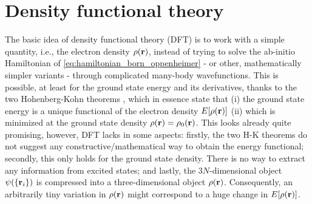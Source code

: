 \documentclass[../../main.tex]{subfiles}
\begin{document}
\section{Density functional theory}\label{sec:dft}

The basic idea of density functional theory (DFT) is to work with a simple quantity, i.e., the electron density $\rho(\textbf{r})$, instead of trying to solve the ab-initio Hamiltonian of \eqref{eq:hamiltonian_born_oppenheimer} - or other, mathematically simpler variants - through complicated many-body wavefunctions. This is possible, at least for the ground state energy and its derivatives, thanks to the two Hohenberg-Kohn theorems \cite{Hohenberg1964}, which in essence state that (i) the ground state energy is a unique functional of the electron density $E[\rho(\textbf{r})]$ (ii) which is minimized at the ground state density $\rho(\textbf{r})=\rho_0(\textbf{r})$. This looks already quite promising, however, DFT lacks in some aspects: firstly, the two H-K theorems do not suggest any constructive/mathematical way to obtain the energy functional; secondly, this only holds for the ground state density. There is no way to extract any information from excited states; and lastly, the $3N$-dimensional object $\psi(\{\textbf{r}_i\})$ is compressed into a three-dimensional object $\rho(\textbf{r})$. Consequently, an arbitrarily tiny variation in $\rho(\textbf{r})$ might correspond to a huge change in $E[\rho(\textbf{r})]$.
\end{document}
